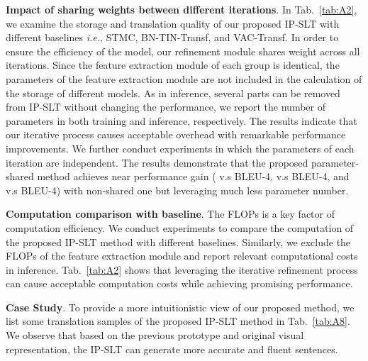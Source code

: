 \documentclass[10pt,twocolumn,letterpaper]{article}
\begin{document}
    \smallskip
    \noindent \textbf{Impact of sharing weights between different iterations}.
    In Tab.~\ref{tab:A2}, we examine the storage and translation quality of our proposed IP-SLT with different baselines \emph{i.e.}, STMC, BN-TIN-Transf, and VAC-Transf. In order to ensure the efficiency of the model, our refinement module shares weight across all iterations. 
    Since the feature extraction module of each group is identical, the parameters of the feature extraction module are not included in the calculation of the storage of different models.
    As in inference, several parts can be removed from IP-SLT without changing the performance, we report the number of parameters in both training and inference, respectively. The results indicate that our iterative process causes acceptable overhead with remarkable performance improvements. We further conduct experiments in which the parameters of each iteration are independent. The results demonstrate that the proposed parameter-shared method achieves near performance gain ( v.s  BLEU-4,  v.s  BLEU-4, and  v.s  BLEU-4) with non-shared one but leveraging much less parameter number.

    

    \smallskip
    \noindent \textbf{Computation comparison with baseline}. 
    The FLOPs is a key factor of computation efficiency. We conduct experiments to compare the computation of the proposed IP-SLT method with different baselines. 
    Similarly, we exclude the FLOPs of the feature extraction module and report relevant computational costs in inference.
    Tab.~\ref{tab:A2} shows that leveraging the iterative refinement process can cause acceptable computation costs while achieving promising performance.
    
    
     
    \smallskip
    \noindent \textbf{Case Study}.
    To provide a more intuitionistic view of our proposed method, we list some translation samples of the proposed IP-SLT method in Tab.~\ref{tab:A8}. We observe that based on the previous prototype and original visual representation, the IP-SLT can generate more accurate and fluent sentences. 
    
\end{document}
